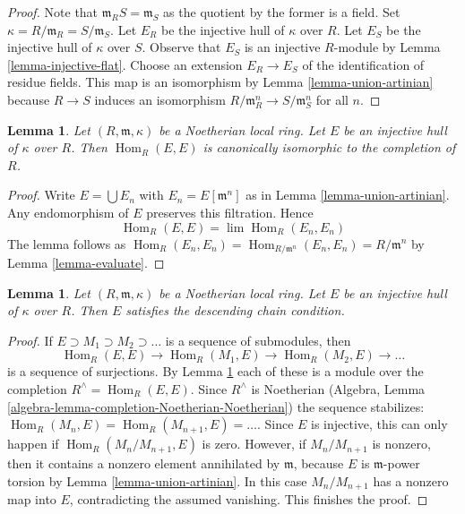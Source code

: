 \documentclass{stacks-project}
\theoremstyle{plain}
\newtheorem{lemma}[subsection]{Lemma}
\theoremstyle{definition}
\theoremstyle{remark}
\numberwithin{equation}{subsection}
\def\lim{\mathop{\mathrm{lim}}\nolimits}
\def\Hom{\mathop{\mathrm{Hom}}\nolimits}
\begin{document}
\begin{proof}
Note that $\mathfrak m_RS = \mathfrak m_S$ as the quotient by the former
is a field. Set $\kappa = R/\mathfrak m_R = S/\mathfrak m_S$.
Let $E_R$ be the injective hull of $\kappa$ over $R$.
Let $E_S$ be the injective hull of $\kappa$ over $S$.
Observe that $E_S$ is an injective $R$-module by
Lemma \ref{lemma-injective-flat}.
Choose an extension $E_R \to E_S$ of the identification of
residue fields. This map is an isomorphism by
Lemma \ref{lemma-union-artinian}
because $R \to S$ induces an isomorphism
$R/\mathfrak m_R^n \to S/\mathfrak m_S^n$ for all $n$.
\end{proof}

\begin{lemma}
\label{lemma-endos}
Let $(R, \mathfrak m, \kappa)$ be a Noetherian local ring.
Let $E$ be an injective hull of $\kappa$ over $R$. Then
$\Hom_R(E, E)$ is canonically isomorphic to the completion of $R$.
\end{lemma}

\begin{proof}
Write $E = \bigcup E_n$ with $E_n = E[\mathfrak m^n]$ as in
Lemma \ref{lemma-union-artinian}. Any endomorphism of $E$
preserves this filtration. Hence
$$
\Hom_R(E, E) = \lim \Hom_R(E_n, E_n)
$$
The lemma follows as
$\Hom_R(E_n, E_n) = \Hom_{R/\mathfrak m^n}(E_n, E_n) = R/\mathfrak m^n$
by Lemma \ref{lemma-evaluate}.
\end{proof}

\begin{lemma}
\label{lemma-injective-hull-has-dcc}
Let $(R, \mathfrak m, \kappa)$ be a Noetherian local ring.
Let $E$ be an injective hull of $\kappa$ over $R$. Then
$E$ satisfies the descending chain condition.
\end{lemma}

\begin{proof}
If $E \supset M_1 \supset M_2 \supset \ldots$ is a sequence of submodules, then
$$
\Hom_R(E, E) \to \Hom_R(M_1, E) \to \Hom_R(M_2, E) \to \ldots
$$
is a sequence of surjections. By Lemma \ref{lemma-endos} each of these is a
module over the completion $R^\wedge = \Hom_R(E, E)$.
Since $R^\wedge$ is Noetherian
(Algebra, Lemma \ref{algebra-lemma-completion-Noetherian-Noetherian})
the sequence stabilizes: $\Hom_R(M_n, E) = \Hom_R(M_{n + 1}, E) = \ldots$.
Since $E$ is injective, this can only happen if $\Hom_R(M_n/M_{n + 1}, E)$
is zero. However, if $M_n/M_{n + 1}$ is nonzero, then it contains a
nonzero element annihilated by $\mathfrak m$, because $E$ is
$\mathfrak m$-power torsion by Lemma \ref{lemma-union-artinian}.
In this case $M_n/M_{n + 1}$ has a nonzero map into $E$, contradicting
the assumed vanishing. This finishes the proof.
\end{proof}
\end{document}
